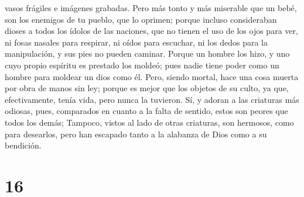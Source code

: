 vasos frágiles e imágenes grabadas.  Pero más tonto y más
miserable que un bebé, son los enemigos de tu pueblo, que lo oprimen;
 porque incluso consideraban dioses a todos los ídolos de
las naciones, que no tienen el uso de los ojos para ver, ni fosas
nasales para respirar, ni oídos para escuchar, ni los dedos para la
manipulación, y sus pies no pueden caminar.  Porque un
hombre los hizo, y uno cuyo propio espíritu es prestado los moldeó; pues
nadie tiene poder como un hombre para moldear un dios como él.
 Pero, siendo mortal, hace una cosa muerta por obra de
manos sin ley; porque es mejor que los objetos de su culto, ya que,
efectivamente, tenía vida, pero nunca la tuvieron.  Sí, y
adoran a las criaturas más odiosas, pues, comparados en cuanto a la
falta de sentido, estos son peores que todos los demás; 
Tampoco, vistos al lado de otras criaturas, son hermosos, como para
desearlos, pero han escapado tanto a la alabanza de Dios como a su
bendición.

\hypertarget{section-15}{%
\section{16}\label{section-15}}

